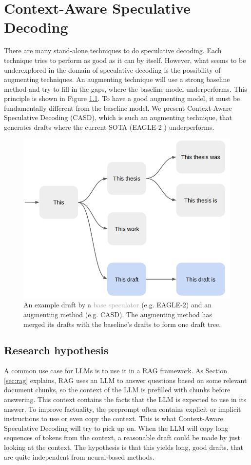 
\chapter{Context-Aware Speculative Decoding}
\label{sec:casd}

There are many stand-alone techniques to do speculative decoding. Each technique tries to perform as good as it can by itself. However, what seems to be underexplored in the domain of speculative decoding is the possibility of augmenting techniques. An augmenting technique will use a strong baseline method and try to fill in the gaps, where the baseline model underperforms. This principle is shown in Figure \ref{fig:spec_dec_casd_augment}. To have a good augmenting model, it must be fundamentally different from the baseline model. We present Context-Aware Speculative Decoding (CASD), which is such an augmenting technique, that generates drafts where the current SOTA (EAGLE-2 \cite{li2024eagle}) underperforms.

\begin{figure}[h]
	\centering
	\includegraphics[width=0.7\linewidth]{fig/spec_dec_casd_augment.png}
	\caption{An example draft by a \textcolor{darkgray}{base speculator} (e.g. EAGLE-2) and an \textcolor{blue-ish}{augmenting method} (e.g. CASD). The augmenting method has merged its drafts with the baseline's drafts to form one draft tree.}
	\label{fig:spec_dec_casd_augment}
\end{figure}

\section{Research hypothesis}
A common use case for LLMs is to use it in a RAG framework. As Section \ref{sec:rag} explains, RAG uses an LLM to answer questions based on some relevant document chunks, so the context of the LLM is prefilled with chunks before answering. This context contains the facts that the LLM is expected to use in its answer. To improve factuality, the preprompt often contains explicit or implicit instructions to use or even copy the context. This is what Context-Aware Speculative Decoding will try to pick up on. When the LLM will copy long sequences of tokens from the context, a reasonable draft could be made by just looking at the context. The hypothesis is that this yields long, good drafts, that are quite independent from neural-based methods.

